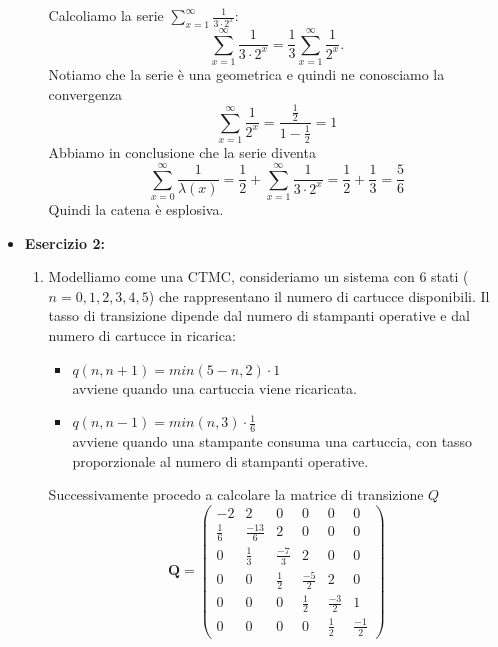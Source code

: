 \documentclass[a4paper,12pt]{article}
\begin{document}
\begin{itemize}
\begin{enumerate}[label=\alph*)]
			Calcoliamo la serie \(\sum_{x=1}^\infty \frac{1}{3 \cdot 2^x}\):
			\[
			\sum_{x=1}^\infty \frac{1}{3 \cdot 2^x} = \frac{1}{3} \sum_{x=1}^\infty \frac{1}{2^x}.
			\]
			Notiamo che la serie è una geometrica e quindi ne conosciamo la convergenza\\
			\[
			\sum_{x=1}^\infty \frac{1}{2^x} = \frac{\frac{1}{2}}{1-\frac{1}{2}}=1
			\]
			Abbiamo in conclusione che la serie diventa\\
			\[
			\sum_{x=0}^\infty \frac{1}{\lambda(x)} = \frac{1}{2} + \sum_{x=1}^\infty \frac{1}{3 \cdot 2^x}=\frac{1}{2}+\frac{1}{3}=\frac{5}{6}
			\]
			Quindi la catena è esplosiva.
		\end{enumerate}
		\newpage
		\item \textbf{Esercizio 2: }
		\begin{enumerate}[label=\alph*)]
			\item Modelliamo come una CTMC, consideriamo un sistema con 6 stati ($n=0,1,2,3,4,5$) che rappresentano il numero di cartucce disponibili. Il tasso di transizione dipende dal numero di stampanti operative e dal numero di cartucce in ricarica:\\
			\begin{itemize}
				\item $q(n,n+1)=min(5-n,2) \cdot 1$\\ avviene quando una cartuccia viene ricaricata. 
				\item $q(n,n-1)=min(n,3) \cdot \frac{1}{6}$\\ avviene quando una stampante consuma una cartuccia, con tasso proporzionale al numero di stampanti operative.
			\end{itemize}
			Successivamente procedo a calcolare la matrice di transizione $Q$\\
			\[
			\mathbf{Q} =
			\begin{pmatrix}
				-2 & 2 & 0 & 0 & 0 & 0 \\
				\frac{1}{6} & \frac{-13}{6} & 2 & 0 & 0 & 0 \\
				0 & \frac{1}{3} & \frac{-7}{3} & 2 & 0 & 0 \\
				0 & 0 & \frac{1}{2} & \frac{-5}{2} & 2 & 0 \\
				0 & 0 & 0 & \frac{1}{2} & \frac{-3}{2} & 1 \\
				0 & 0 & 0 & 0 & \frac{1}{2} & \frac{-1}{2}
				

\end{pmatrix}\]
\end{enumerate}
\end{itemize}
\end{document}
